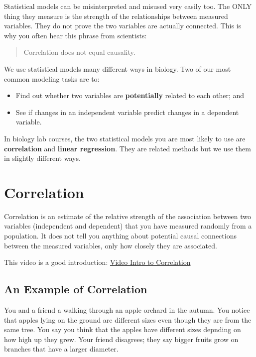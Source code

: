 \documentclass[
]{book}
\providecommand{\tightlist}{%
  \setlength{\itemsep}{0pt}\setlength{\parskip}{0pt}}
\begin{document}
Statistical models can be misinterpreted and misused very easily too. The ONLY thing they measure is the strength of the relationships between measured variables. They do not prove the two variables are actually connected. This is why you often hear this phrase from scientists:

\begin{quote}
Correlation does not equal causality.
\end{quote}

We use statistical models many different ways in biology. Two of our most common modeling tasks are to:

\begin{itemize}
\tightlist
\item
  Find out whether two variables are \textbf{potentially} related to each other; and
\item
  See if changes in an independent variable predict changes in a dependent variable.
\end{itemize}

In biology lab courses, the two statistical models you are most likely to use are \textbf{correlation} and \textbf{linear regression}. They are related methods but we use them in slightly different ways.

\hypertarget{correlation}{%
\section{Correlation}\label{correlation}}

Correlation is an estimate of the relative strength of the association between two variables (independent and dependent) that you have measured randomly from a population. It does not tell you anything about potential causal connections between the measured variables, only how closely they are associated.

This video is a good introduction: \href{https://youtu.be/GtV-VYdNt_g}{Video Intro to Correlation}

\hypertarget{an-example-of-correlation}{%
\subsection{An Example of Correlation}\label{an-example-of-correlation}}

You and a friend a walking through an apple orchard in the autumn. You notice that apples lying on the ground are different sizes even though they are from the same tree. You say you think that the apples have different sizes depnding on how high up they grew. Your friend disagrees; they say bigger fruits grow on branches that have a larger diameter.
\end{document}
